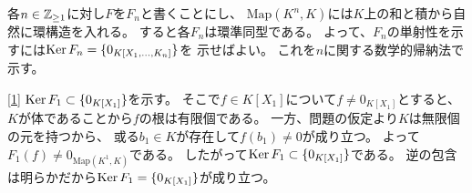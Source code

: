 \documentclass[report]{jlreq}
\begin{document}

\begin{answer}
    各$n \in \mathbb{Z}_{\ge 1}$に対し$F$を$F_n$と書くことにし、
    $\mathrm{Map}(K^n, K)$には$K$上の和と積から自然に環構造を入れる。
    すると各$F_n$は環準同型である。
    よって、$F_n$の単射性を示すには$\operatorname{\mathrm{Ker}} F_n = \{ 0_{K[X_1, \dots, K_n]} \}$を
    示せばよい。
    これを$n$に関する数学的帰納法で示す。

    \uline{[1]} \quad
    $\operatorname{\mathrm{Ker}} F_1 \subset \{ 0_{K[X_1]} \}$を示す。
    そこで$f \in K[X_1]$について$f \neq 0_{K[X_1]}$とすると、
    $K$が体であることから$f$の根は有限個である。
    一方、問題の仮定より$K$は無限個の元を持つから、
    或る$b_1 \in K$が存在して$f(b_1) \neq 0$が成り立つ。
    よって$F_1(f) \neq 0_{\mathrm{Map}(K^1, K)}$である。
    したがって$\operatorname{\mathrm{Ker}} F_1 \subset \{ 0_{K[X_1]} \}$である。
    逆の包含は明らかだから$\operatorname{\mathrm{Ker}} F_1 = \{ 0_{K[X_1]} \}$が成り立つ。


\end{answer}
\end{document}
